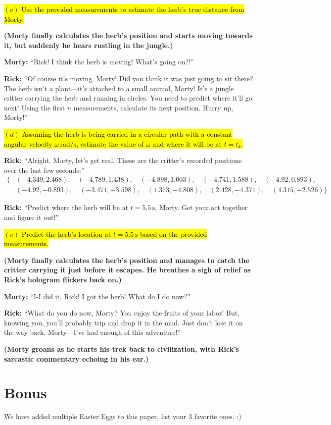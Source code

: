 \documentclass[a4paper, 12pt]{exam}
\begin{document}
\bigskip

\hl{$(c)$ Use the provided measurements to estimate the herb's true distance from Morty.}
\bigskip

\noindent \textbf{(Morty finally calculates the herb’s position and starts moving towards it, but suddenly he hears rustling in the jungle.)}

\bigskip
\noindent \textbf{Morty:} “Rick! I think the herb is moving! What’s going on?!” \bigskip

\noindent \textbf{Rick:} “Of course it’s moving, Morty! Did you think it was just going to sit there? The herb isn’t a plant—it’s attached to a small animal, Morty! It’s a jungle critter carrying the herb and running in circles. You need to predict where it’ll go next! Using the first \(n\) measurements, calculate its next position. Hurry up, Morty!”

\bigskip

\hl{$(d)$ Assuming the herb is being carried in a circular path with a constant angular velocity $\omega \, \mathrm{rad/s}$, estimate the value of $\omega$ and where it will be at $t = t_k$.}

\bigskip
\noindent \textbf{Rick:} “Alright, Morty, let’s get real. These are the critter’s recorded positions over the last few seconds:”
\begin{align*}
\{
&(-4.349, 2.468), \quad (-4.789, 1.438), \quad (-4.898, 1.003), \quad (-4.741, 1.588), \quad (-4.92, 0.893), \\
&(-4.92, -0.893), \quad (-3.471, -3.598), \quad (1.373, -4.808), \quad (2.428, -4.371), \quad (4.315, -2.526)
\}
\end{align*}

\noindent \textbf{Rick:} “Predict where the herb will be at \(t = 5.5 \, \mathrm{s}\), Morty. Get your act together and figure it out!”

\bigskip

\hl{$(e)$ Predict the herb's location at $t = 5.5 \, \mathrm{s}$ based on the provided measurements.}
\bigskip

\noindent \textbf{(Morty finally calculates the herb’s position and manages to catch the critter carrying it just before it escapes. He breathes a sigh of relief as Rick’s hologram flickers back on.)}

\bigskip
\noindent \textbf{Morty:} “I-I did it, Rick! I got the herb! What do I do now?” \bigskip

\noindent \textbf{Rick:} “What do you do now, Morty? You enjoy the fruits of your labor! But, knowing you, you’ll probably trip and drop it in the mud. Just don’t lose it on the way back, Morty—I’ve had enough of this adventure!”

\bigskip

\noindent \textbf{(Morty groans as he starts his trek back to civilization, with Rick’s sarcastic commentary echoing in his ear.)}

\pagebreak

\section*{Bonus}
We have added multiple Easter Eggs to this paper, list your 3 favorite ones. :)
\end{document}
